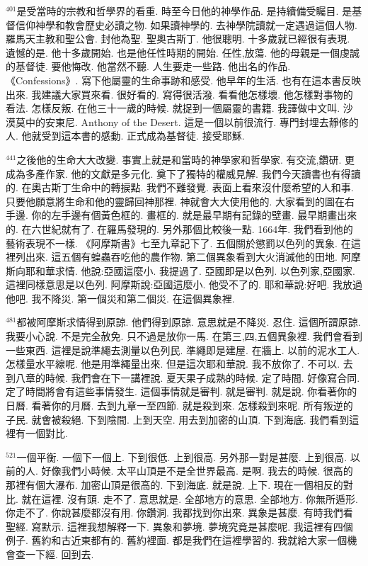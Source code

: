 \documentclass{book}
\begin{document}
$^{401}$是受當時的宗教和哲學界的看重.
時至今日他的神學作品.
是持續備受矚目.
是基督信仰神學和教會歷史必讀之物.
如果讀神學的.
去神學院讀就一定遇過這個人物.
羅馬天主教和聖公會.
封他為聖.
聖奧古斯丁.
他很聰明.
十多歲就已經很有表現.
遺憾的是.
他十多歲開始.
也是他任性時期的開始.
任性,放蕩.
他的母親是一個虔誠的基督徒.
要他悔改.
他當然不聽.
人生要走一些路.
他出名的作品.
《Confessions》.
寫下他屬靈的生命事跡和感受.
他早年的生活.
也有在這本書反映出來.
我建議大家買來看.
很好看的.
寫得很活潑.
看看他怎樣壞.
他怎樣對事物的看法.
怎樣反叛.
在他三十一歲的時候.
就捉到一個屬靈的書籍.
我譯做中文叫.
沙漠莫中的安東尼.
Anthony of the Desert.
這是一個以前很流行.
專門封埋去靜修的人.
他就受到這本書的感動.
正式成為基督徒.
接受耶穌.

$^{441}$之後他的生命大大改變.
事實上就是和當時的神學家和哲學家.
有交流,鑽研.
更成為多產作家.
他的文獻是多元化.
奠下了獨特的權威見解.
我們今天讀書也有得讀的.
在奧古斯丁生命中的轉捩點.
我們不難發覺.
表面上看來沒什麼希望的人和事.
只要他願意將生命和他的靈歸回神那裡.
神就會大大使用他的.
大家看到的圖在右手邊.
你的左手邊有個黃色框的.
畫框的.
就是最早期有記錄的壁畫.
最早期畫出來的.
在六世紀就有了.
在羅馬發現的.
另外那個比較後一點.
1664年.
我們看到他的藝術表現不一樣.
《阿摩斯書》七至九章記下了.
五個關於懲罰以色列的異象.
在這裡列出來.
這五個有蝗蟲吞吃他的農作物.
第二個異象看到大火消滅他的田地.
阿摩斯向耶和華求情.
他說:亞國這麼小.
我提過了.
亞國即是以色列.
以色列家,亞國家.
這裡同樣意思是以色列.
阿摩斯說:亞國這麼小.
他受不了的.
耶和華說:好吧.
我放過他吧.
我不降災.
第一個災和第二個災.
在這個異象裡.

$^{481}$都被阿摩斯求情得到原諒.
他們得到原諒.
意思就是不降災.
忍住.
這個所謂原諒.
我要小心說.
不是完全赦免.
只不過是放你一馬.
在第三,四,五個異象裡.
我們會看到一些東西.
這裡是說準繩去測量以色列民.
準繩即是建屋.
在牆上.
以前的泥水工人.
怎樣量水平線呢.
他是用準繩量出來.
但是這次耶和華說.
我不放你了.
不可以.
去到八章的時候.
我們會在下一講裡說.
夏天果子成熟的時候.
定了時間.
好像寫合同.
定了時間將會有這些事情發生.
這個事情就是審判.
就是審判.
就是說.
你看著你的日曆.
看著你的月曆.
去到九章一至四節.
就是殺到來.
怎樣殺到來呢.
所有叛逆的子民.
就會被殺絕.
下到陰間.
上到天空.
用去到加密的山頂.
下到海底.
我們看到這裡有一個對比.

$^{521}$一個平衡.
一個下一個上.
下到很低.
上到很高.
另外那一對是甚麼.
上到很高.
以前的人.
好像我們小時候.
太平山頂是不是全世界最高.
是啊.
我去的時候.
很高的那裡有個大瀑布.
加密山頂是很高的.
下到海底.
就是說.
上下.
現在一個相反的對比.
就在這裡.
沒有頭.
走不了.
意思就是.
全部地方的意思.
全部地方.
你無所遁形.
你走不了.
你說甚麼都沒有用.
你鑽洞.
我都找到你出來.
異象是甚麼.
有時我們看聖經.
寫默示.
這裡我想解釋一下.
異象和夢境.
夢境究竟是甚麼呢.
我這裡有四個例子.
舊約和古近東都有的.
舊約裡面.
都是我們在這裡學習的.
我就給大家一個機會查一下經.
回到去.
\end{document}
